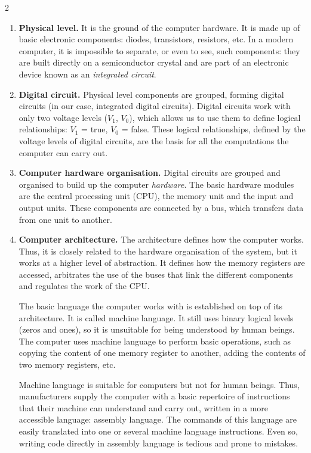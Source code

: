 \begin{paracol}{2}
\switchcolumn
\begin{enumerate}
\item \textbf{Physical level.} It is the ground of the computer hardware. It is made up of basic electronic components: diodes, transistors, resistors, etc. In a modern computer, it is impossible to separate, or even to see, such components: they are built directly on a semiconductor crystal and are part of an electronic device known as an \emph{integrated circuit}.

\item \textbf{Digital circuit.}
Physical level components are grouped, forming digital circuits (in our case, integrated digital circuits). Digital circuits work with only two voltage levels ($V_1$, $V_0$), which allows us to use them to define logical relationships: $V_1$ = true, $V_0$ = false. These logical relationships, defined by the voltage levels of digital circuits, are the basis for all the computations the computer can carry out.

\item \textbf{Computer hardware organisation.}
Digital circuits are grouped and organised to build up the computer \emph{hardware}. The basic hardware modules are the central processing unit (CPU), the memory unit and the input and output units. These components are connected by a bus, which transfers data from one unit to another.

\item \textbf{Computer architecture.} 
The architecture defines how the computer works. Thus, it is closely related to the hardware organisation of the system, but it works at a higher level of abstraction. It defines how the memory registers are accessed, arbitrates the use of the buses that link the different components and regulates the work of the CPU.

The basic language the computer works with is established on top of its architecture. It is called machine language. It still uses binary logical levels (zeros and ones), so it is unsuitable for being understood by human beings. The computer uses machine language to perform basic operations, such as copying the content of one memory register to another, adding the contents of two memory registers, etc.

Machine language is suitable for computers but not for human beings. Thus, manufacturers supply the computer with a basic repertoire of instructions that their machine can understand and carry out, written in a more accessible language: assembly language. The commands of this language are easily translated into one or several machine language instructions. Even so, writing code directly in assembly language is tedious and prone to mistakes.


\end{enumerate}
\end{paracol}
